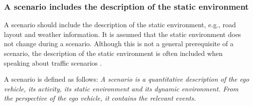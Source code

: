 \subsubsection{A scenario includes the description of the static environment}
A scenario should include the description of the static environment, e.g., road layout and weather information. It is assumed that the static environment does not change during a scenario. Although this is not a general prerequisite of a scenario, the description of the static environment is often included when speaking about traffic scenarios \cite{geyer2014, ulbrich2015, elrofai2016scenario, hulshof2013autonomous, ebner2011identifying, schuldt2013effiziente}.

A scenario is defined as follows: \emph{A scenario is a quantitative description of the ego vehicle, its activity, its static environment and its dynamic environment. From the perspective of the ego vehicle, it contains the relevant events.}
